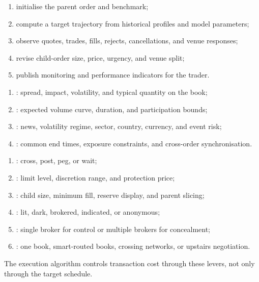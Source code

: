 \documentclass[a4paper,oneside,openany]{book}
\begin{document}
\begin{process} 
\begin{enumerate}[label=\roman*.]
\setlength{\itemsep}{0pt}
\item initialise the parent order and benchmark;
\item compute a target trajectory from historical profiles and model parameters;
\item observe quotes, trades, fills, rejects, cancellations, and venue responses;
\item revise child-order size, price, urgency, and venue split;
\item publish monitoring and performance indicators for the trader.
\end{enumerate}
\end{process}

\begin{taxonomy} 
\begin{enumerate}[label=\roman*.]
\setlength{\itemsep}{0pt}
\item {}: spread, impact, volatility, and typical quantity on the book;
\item {}: expected volume curve, duration, and participation bounds;
\item {}: news, volatility regime, sector, country, currency, and event risk;
\item {}: common end times, exposure constraints, and cross-order synchronisation.
\end{enumerate}
\end{taxonomy}

\begin{taxonomy} 
\begin{enumerate}[label=\roman*.]
\setlength{\itemsep}{0pt}
\item {}: cross, post, peg, or wait;
\item {}: limit level, discretion range, and protection price;
\item {}: child size, minimum fill, reserve display, and parent slicing;
\item {}: lit, dark, brokered, indicated, or anonymous;
\item {}: single broker for control or multiple brokers for concealment;
\item {}: one book, smart-routed books, crossing networks, or upstairs negotiation.
\end{enumerate}
The execution algorithm controls transaction cost through these levers, not only through the target schedule.
\end{taxonomy}
\end{document}
